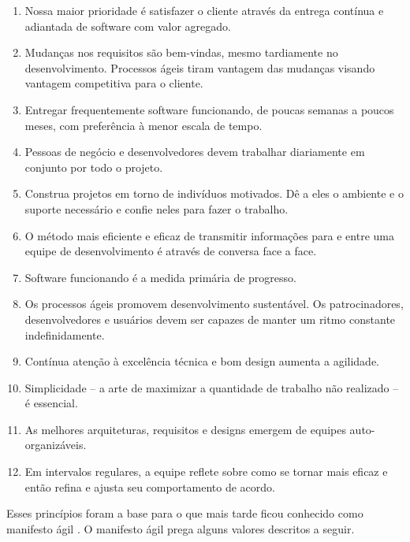 \documentclass[
	article,			%
	11pt,				%
	oneside,			%
	a4paper,			%
	english,			%
	brazil,				%
	sumario=tradicional
	]{abntex2}
\begin{document}
\begin{enumerate}
   \item Nossa maior prioridade é satisfazer o cliente através da entrega
   contínua e adiantada de software com valor agregado.
   \item Mudanças nos requisitos são bem-vindas, mesmo tardiamente no
   desenvolvimento. Processos ágeis tiram vantagem das mudanças visando
   vantagem competitiva para o cliente.
   \item Entregar frequentemente software funcionando, de poucas semanas a
   poucos meses, com preferência à menor escala de tempo.
   \item Pessoas de negócio e desenvolvedores devem trabalhar diariamente em
   conjunto por todo o projeto.
   \item Construa projetos em torno de indivíduos motivados. Dê a eles o
   ambiente e o suporte necessário e confie neles para fazer o trabalho.
   \item O método mais eficiente e eficaz de transmitir informações para e
   entre uma equipe de desenvolvimento é através de conversa face a face.
   \item Software funcionando é a medida primária de progresso.
   \item Os processos ágeis promovem desenvolvimento sustentável. Os
   patrocinadores, desenvolvedores e usuários devem ser capazes de manter um
   ritmo constante indefinidamente.
   \item Contínua atenção à excelência técnica e bom design aumenta a
   agilidade.
   \item Simplicidade -- a arte de maximizar a quantidade de trabalho não
   realizado -- é essencial.
   \item As melhores arquiteturas, requisitos e designs emergem de equipes
   auto-organizáveis.
   \item Em intervalos regulares, a equipe reflete sobre como se tornar mais
   eficaz e então refina e ajusta seu comportamento de acordo.
\end{enumerate}

Esses princípios foram a base para o que mais tarde ficou conhecido como
manifesto ágil \cite{agilemanifesto}. O manifesto ágil prega alguns valores
descritos a seguir.
\end{document}
